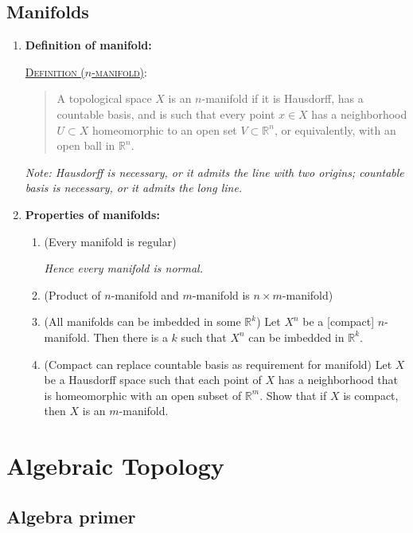 \documentclass[letterpaper, 12pt]{book}
\newcommand{\RR}{\mathbb{R}}
\newcommand{\defn}[2]{\textsc{\underline{Definition (#1)}:}\begin{quote} #2\end{quote}}
\begin{document}
\chapter{Manifolds}
    \begin{enumerate}[resume]
    \item \textbf{Definition of manifold:}

        \defn{$n$-manifold}{A topological space $X$ is an $n$-manifold if it is Hausdorff, has a countable basis, and is such that every point $x\in X$ has a neighborhood $U\subset X$ homeomorphic to an open set $V\subset\RR^n$, or equivalently, with an open ball in $\RR^n$.}

        \textit{Note: Hausdorff is necessary, or it admits the line with two origins; countable basis is necessary, or it admits the long line.}
    \item \textbf{Properties of manifolds:}
        \begin{enumerate}
        \item (Every manifold is regular)

            \textit{Hence every manifold is normal.}
        \item (Product of $n$-manifold and $m$-manifold is $n\times m$-manifold)
        \item (All manifolds can be imbedded in some $\RR^k$) Let $X^n$ be a [compact] $n$-manifold. Then there is a $k$ such that $X^n$ can be imbedded in $\RR^k$. %
        \item (Compact can replace countable basis as requirement for manifold) Let $X$ be a Hausdorff space such that each point of $X$ has a neighborhood that is homeomorphic with an open subset of $\RR^m$. Show that if $X$ is compact, then $X$ is an $m$-manifold.
        \end{enumerate}
    \end{enumerate}

\part{Algebraic Topology}

\chapter{Algebra primer}
\end{document}
